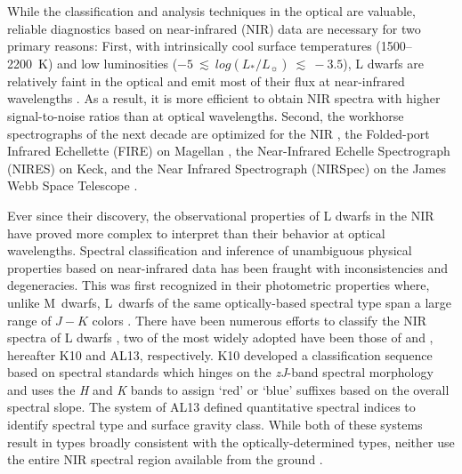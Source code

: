 \documentclass[modern]{aastex61}
\begin{document}
While the classification and analysis techniques in the optical are valuable, reliable diagnostics based on near-infrared (NIR) data are necessary for two primary reasons:
First, with intrinsically cool surface temperatures (1500--2200~K) and low luminosities ($-5~\lesssim~log(L_*/L_\sun)~\lesssim~-3.5$), L dwarfs are relatively faint in the optical and emit most of their flux at near-infrared wavelengths \citep[e.g.,][]{Filippazzo:2015dv}.
As a result, it is more efficient to obtain NIR spectra with higher signal-to-noise ratios than at optical wavelengths.
Second, the workhorse spectrographs of the next decade are optimized for the NIR , the Folded-port Infrared Echellette (FIRE) on Magellan \citep{Simcoe:2013kh}, the Near-Infrared Echelle Spectrograph (NIRES) on Keck, and the Near Infrared Spectrograph (NIRSpec) on the James Webb Space Telescope \citep{Ferruit:2012em}\added{)}.

Ever since their discovery, the observational properties of L dwarfs in the NIR have proved more complex to interpret than their behavior at optical wavelengths.
Spectral classification and inference of unambiguous physical properties based on near-infrared data has been fraught with inconsistencies and degeneracies.
This was first recognized in their photometric properties where, unlike M~dwarfs, L~dwarfs of the same optically-based spectral type span a large range of $J-K$ colors \citep[e.g.,][]{Leggett:2003tm}.
There have been numerous efforts to classify the NIR spectra of L dwarfs \citep{Reid01_NIR, Testi01, Geballe02,Burgasser07_subdwarfs}, two of the most widely adopted have been those of \citet{Kirkpatrick10} and \citet{Allers:2013hk}, hereafter K10 and AL13, respectively.
K10 developed a classification sequence based on spectral standards which hinges on the \emph{zJ}-band spectral morphology and uses the \emph{H} and \emph{K} bands to assign `red' or `blue' suffixes based on the overall spectral slope.
The system of AL13 defined quantitative spectral indices to identify spectral type and surface gravity class.
While both of these systems result in types broadly consistent with the optically-determined types, neither use the entire NIR spectral region available from the ground \citep{Kirkpatrick05}.
\end{document}
